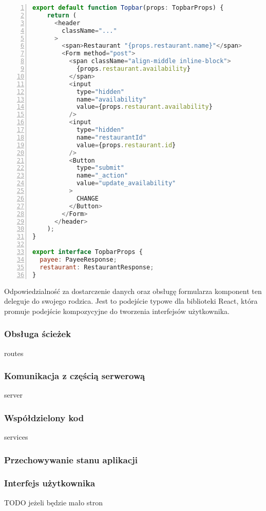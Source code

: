 \begin{lstlisting}[caption={Kod komponentu interfejsu użytkownika - pasek nawigacji managera restauracji},label={lst:client-component},captionpos=b,language=JavaScript,numbers=left,showstringspaces=false]
export default function Topbar(props: TopbarProps) {
    return (
      <header
        className="..."
      >
        <span>Restaurant "{props.restaurant.name}"</span>
        <Form method="post">
          <span className="align-middle inline-block">
            {props.restaurant.availability}
          </span>
          <input
            type="hidden"
            name="availability"
            value={props.restaurant.availability}
          />
          <input
            type="hidden"
            name="restaurantId"
            value={props.restaurant.id}
          />
          <Button 
            type="submit" 
            name="_action" 
            value="update_availability"
          >
            CHANGE
          </Button>
        </Form>
      </header>
    );
}
  
export interface TopbarProps {
  payee: PayeeResponse;
  restaurant: RestaurantResponse;
}
\end{lstlisting}

Odpowiedzialność za dostarczenie danych oraz obsługę formularza komponent ten deleguje do swojego rodzica. Jest to podejście typowe dla biblioteki React, która promuje podejście kompozycyjne do tworzenia interfejsów użytkownika.

\subsubsection{Obsługa ścieżek} routes

\subsubsection{Komunikacja z częścią serwerową} server

\subsubsection{Współdzielony kod} services

\subsubsection{Przechowywanie stanu aplikacji}

\subsubsection{Interfejs użytkownika}

TODO jeżeli będzie mało stron